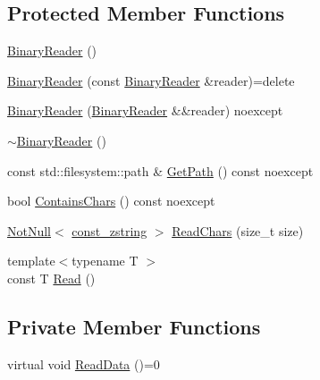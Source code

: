 \subsection*{Protected Member Functions}
\begin{DoxyCompactItemize}
\item 
\mbox{\hyperlink{classmage_1_1_binary_reader_aab82579cef4f2f022273cf1adfcc8497}{Binary\+Reader}} ()
\item 
\mbox{\hyperlink{classmage_1_1_binary_reader_a8c1ff948f1d056439f3d8cc37d7f507c}{Binary\+Reader}} (const \mbox{\hyperlink{classmage_1_1_binary_reader}{Binary\+Reader}} \&reader)=delete
\item 
\mbox{\hyperlink{classmage_1_1_binary_reader_a520841747b74b4b0e95f8d9b595492fa}{Binary\+Reader}} (\mbox{\hyperlink{classmage_1_1_binary_reader}{Binary\+Reader}} \&\&reader) noexcept
\item 
\mbox{\hyperlink{classmage_1_1_binary_reader_a42e6c31bc53f5214675f845756b5a404}{$\sim$\+Binary\+Reader}} ()
\item 
const std\+::filesystem\+::path \& \mbox{\hyperlink{classmage_1_1_binary_reader_af2c3f4e6a98472a6435dd9d1105b4bc9}{Get\+Path}} () const noexcept
\item 
bool \mbox{\hyperlink{classmage_1_1_binary_reader_af68b85b30fbe8b5f2d4720163a658ab5}{Contains\+Chars}} () const noexcept
\item 
\mbox{\hyperlink{namespacemage_a8769f9d670d6b585ea306cb1062af94b}{Not\+Null}}$<$ \mbox{\hyperlink{namespacemage_abfd9206dc607ceb5d13ec68bf075a5c0}{const\+\_\+zstring}} $>$ \mbox{\hyperlink{classmage_1_1_binary_reader_ad2bed0756a38358fc4a8b10b02007af8}{Read\+Chars}} (size\+\_\+t size)
\item 
{\footnotesize template$<$typename T $>$ }\\const T \mbox{\hyperlink{classmage_1_1_binary_reader_aa99b02137069566c010692093b328a6a}{Read}} ()
\end{DoxyCompactItemize}
\subsection*{Private Member Functions}
\begin{DoxyCompactItemize}
\item 
virtual void \mbox{\hyperlink{classmage_1_1_binary_reader_a67157828a9781644fb55bd7f3558f07c}{Read\+Data}} ()=0
\end{DoxyCompactItemize}
